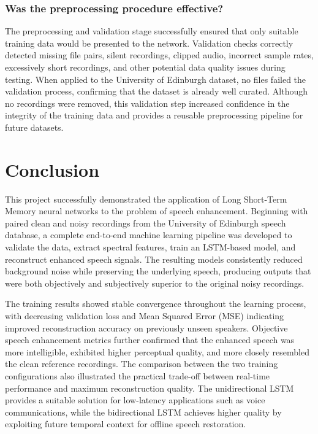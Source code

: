 \documentclass[11pt, letterpaper,titlepage]{article}
\begin{document}
\subsubsection*{Was the preprocessing procedure effective?}

The preprocessing and validation stage successfully ensured that only suitable training data would be presented to the network. Validation checks correctly detected missing file pairs, silent recordings, clipped audio, incorrect sample rates, excessively short recordings, and other potential data quality issues during testing. When applied to the University of Edinburgh dataset, no files failed the validation process, confirming that the dataset is already well curated. Although no recordings were removed, this validation step increased confidence in the integrity of the training data and provides a reusable preprocessing pipeline for future datasets.




\section{Conclusion}

This project successfully demonstrated the application of Long Short-Term Memory neural networks to the problem of speech enhancement. Beginning with paired clean and noisy recordings from the University of Edinburgh speech database, a complete end-to-end machine learning pipeline was developed to validate the data, extract spectral features, train an LSTM-based model, and reconstruct enhanced speech signals. The resulting models consistently reduced background noise while preserving the underlying speech, producing outputs that were both objectively and subjectively superior to the original noisy recordings.

The training results showed stable convergence throughout the learning process, with decreasing validation loss and Mean Squared Error (MSE) indicating improved reconstruction accuracy on previously unseen speakers. Objective speech enhancement metrics further confirmed that the enhanced speech was more intelligible, exhibited higher perceptual quality, and more closely resembled the clean reference recordings. The comparison between the two training configurations also illustrated the practical trade-off between real-time performance and maximum reconstruction quality. The unidirectional LSTM provides a suitable solution for low-latency applications such as voice communications, while the bidirectional LSTM achieves higher quality by exploiting future temporal context for offline speech restoration.
\end{document}
